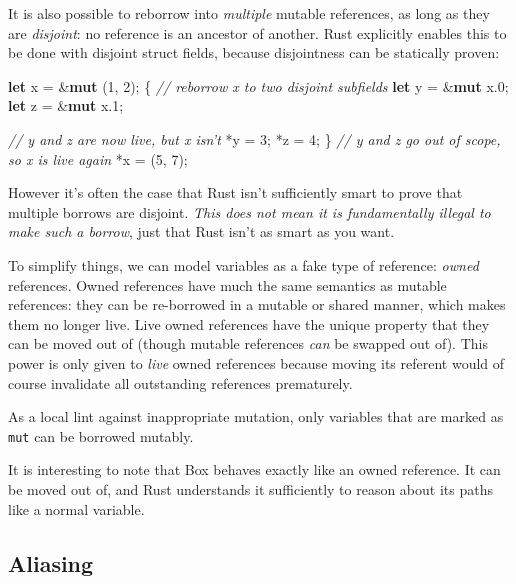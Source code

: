 \documentclass[a4paper,]{book}
\newenvironment{Shaded}{\begin{snugshade}}{\end{snugshade}}
\newcommand{\KeywordTok}[1]{\textcolor[rgb]{0.13,0.29,0.53}{\textbf{{#1}}}}
\newcommand{\DecValTok}[1]{\textcolor[rgb]{0.00,0.00,0.81}{{#1}}}
\newcommand{\CommentTok}[1]{\textcolor[rgb]{0.56,0.35,0.01}{\textit{{#1}}}}
\newcommand{\NormalTok}[1]{{#1}}
\begin{document}
It is also possible to reborrow into \emph{multiple} mutable references,
as long as they are \emph{disjoint}: no reference is an ancestor of
another. Rust explicitly enables this to be done with disjoint struct
fields, because disjointness can be statically proven:

\begin{Shaded}
\begin{Highlighting}[]
\KeywordTok{let} \NormalTok{x = &}\KeywordTok{mut} \NormalTok{(}\DecValTok{1}\NormalTok{, }\DecValTok{2}\NormalTok{);}
\NormalTok{\{}
    \CommentTok{// reborrow x to two disjoint subfields}
    \KeywordTok{let} \NormalTok{y = &}\KeywordTok{mut} \NormalTok{x.}\DecValTok{0}\NormalTok{;}
    \KeywordTok{let} \NormalTok{z = &}\KeywordTok{mut} \NormalTok{x.}\DecValTok{1}\NormalTok{;}

    \CommentTok{// y and z are now live, but x isn't}
    \NormalTok{*y = }\DecValTok{3}\NormalTok{;}
    \NormalTok{*z = }\DecValTok{4}\NormalTok{;}
\NormalTok{\}}
\CommentTok{// y and z go out of scope, so x is live again}
\NormalTok{*x = (}\DecValTok{5}\NormalTok{, }\DecValTok{7}\NormalTok{);}
\end{Highlighting}
\end{Shaded}

However it's often the case that Rust isn't sufficiently smart to prove
that multiple borrows are disjoint. \emph{This does not mean it is
fundamentally illegal to make such a borrow}, just that Rust isn't as
smart as you want.

To simplify things, we can model variables as a fake type of reference:
\emph{owned} references. Owned references have much the same semantics
as mutable references: they can be re-borrowed in a mutable or shared
manner, which makes them no longer live. Live owned references have the
unique property that they can be moved out of (though mutable references
\emph{can} be swapped out of). This power is only given to \emph{live}
owned references because moving its referent would of course invalidate
all outstanding references prematurely.

As a local lint against inappropriate mutation, only variables that are
marked as \texttt{mut} can be borrowed mutably.

It is interesting to note that Box behaves exactly like an owned
reference. It can be moved out of, and Rust understands it sufficiently
to reason about its paths like a normal variable.

\subsection{Aliasing}\label{aliasing}
\end{document}
